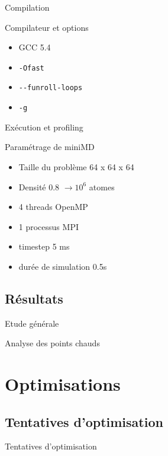 \documentclass[9.5pt]{beamer}
\begin{document}
		\begin{frame}{Compilation}
			\begin{block}{Compilateur et options}
				\begin{itemize}
					\item GCC 5.4
					\item \verb!-Ofast!
					\item \verb!--funroll-loops!
					\item \verb!-g!
				\end{itemize}
			\end{block}
		\end{frame}

		\begin{frame}{Exécution et profiling}
			\begin{block}{Paramétrage de miniMD}
				\begin{itemize}
					\item Taille du problème 64 x 64 x 64
					\item Densité 0.8 $\rightarrow 10^6$ atomes
					\item 4 threads OpenMP
					\item 1 processus MPI
					\item timestep 5 ms
					\item durée de simulation 0.5s
				\end{itemize}
			\end{block}
		\end{frame}

	\subsection{Résultats}
		\begin{frame}{Etude générale}
			
		\end{frame}

		\begin{frame}{Analyse des points chauds}
			
		\end{frame}

\section{Optimisations}
	\subsection{Tentatives d'optimisation}
		\begin{frame}{Tentatives d'optimisation}
		\end{frame}
\end{document}
